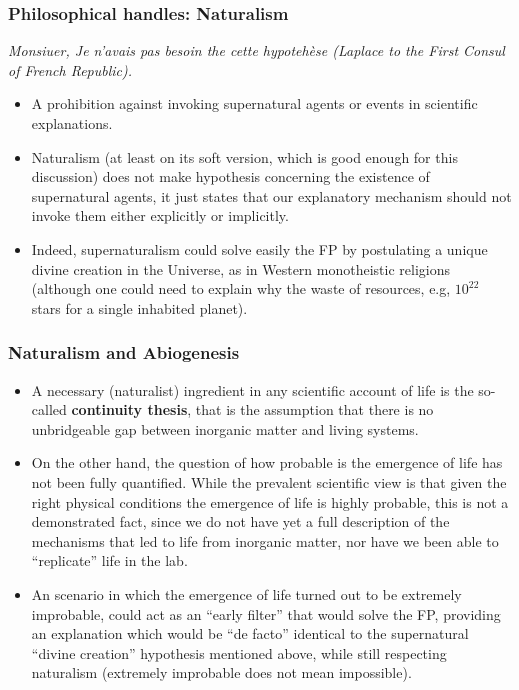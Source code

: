 \begin{frame}
\frametitle{Philosophical handles: Naturalism}

{\em Monsiuer, Je n'avais pas besoin the cette hypotehèse (Laplace to the First Consul of French Republic). }

\vspace{0.5 cm}
\begin{itemize}
\item A prohibition against invoking supernatural agents or events in scientific explanations.
\item Naturalism (at least on its soft version, which is good enough for this discussion) does not make hypothesis concerning the existence of supernatural agents, it just states that our explanatory mechanism should not invoke them either explicitly or implicitly.
\item Indeed, supernaturalism could solve easily the FP by postulating a unique divine creation in the Universe, as in Western monotheistic religions (although one could need to explain why the waste of resources, e.g, $10^{22}$ stars for a single inhabited planet). 
\end{itemize}
\end{frame}


\begin{frame}
\frametitle{Naturalism and Abiogenesis}

\begin{itemize}
\item A necessary (naturalist) ingredient in any scientific account of life is the so-called {\bf continuity thesis}, that is the assumption that there is no unbridgeable gap between inorganic matter and living systems.
\item On the other hand, the question of how probable is the emergence of life has not been fully quantified. While the prevalent scientific view is that given the
 right physical conditions the emergence of life is highly probable, this is not a demonstrated fact, since we do not have yet a full description of the mechanisms that led to life from inorganic matter, nor have we been able to ``replicate'' life in the lab. 
\item An scenario in which the emergence of life turned out to be extremely improbable, could act as an ``early filter'' that would solve the FP, providing an explanation which would be ``de facto'' identical to the supernatural ``divine creation'' hypothesis mentioned above, while still respecting naturalism (extremely improbable does not mean impossible).  
\end{itemize}
\end{frame}

